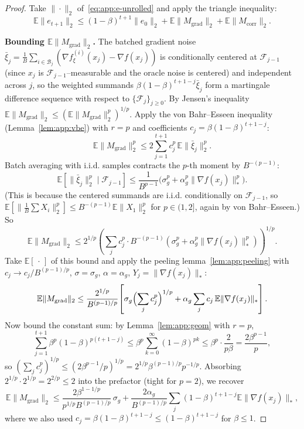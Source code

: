 \documentclass{article}
\theoremstyle{plain}
\theoremstyle{definition}
\theoremstyle{remark}
\begin{document}
\begin{proof}
Take $\|\cdot\|_2$ of~\eqref{eq:app:e-unrolled} and apply the triangle
inequality:
\[
  \mathbb{E}\|e_{t+1}\|_2 \leq (1-\beta)^{t+1}\|e_0\|_2
    + \mathbb{E}\|M_{\mathrm{grad}}\|_2 + \mathbb{E}\|M_{\mathrm{corr}}\|_2.
\]

\smallskip\noindent\textbf{Bounding $\mathbb{E}\|M_{\mathrm{grad}}\|_2$.}
The batched gradient noise $\bar\xi_j = \tfrac1B\sum_{i\in\mathcal{B}_j}
(\nabla f_\xi^{(i)}(x_j) - \nabla f(x_j))$ is conditionally centered at
$\mathcal{F}_{j-1}$ (since $x_j$ is $\mathcal{F}_{j-1}$--measurable and
the oracle noise is centered) and independent across $j$, so the weighted
summands $\beta(1-\beta)^{t+1-j}\bar\xi_j$ form a martingale difference
sequence with respect to $\{\mathcal{F}_j\}_{j \geq 0}$. By Jensen's
inequality $\mathbb{E}\|M_{\mathrm{grad}}\|_2 \leq
(\mathbb{E}\|M_{\mathrm{grad}}\|_2^p)^{1/p}$. Apply the von
Bahr--Esseen inequality (Lemma~\ref{lem:app:vbe}) with $r = p$ and
coefficients $c_j = \beta(1-\beta)^{t+1-j}$:
\[
  \mathbb{E}\|M_{\mathrm{grad}}\|_2^p
  \leq 2\sum_{j=1}^{t+1} c_j^p\, \mathbb{E}\|\bar\xi_j\|_2^p.
\]
Batch averaging with i.i.d. samples contracts the $p$-th moment by
$B^{-(p-1)}$:
\[
  \mathbb{E}[\|\bar\xi_j\|_2^p \mid \mathcal{F}_{j-1}]
  \leq \frac{1}{B^{p-1}}\bigl(\sigma_g^p + \alpha_g^p\|\nabla f(x_j)\|_*^p\bigr).
\]
(This is because the centered summands are i.i.d. conditionally on
$\mathcal{F}_{j-1}$, so $\mathbb{E}[\|\frac{1}{B}\sum X_i\|_2^p] \leq
B^{-(p-1)}\mathbb{E}\|X_1\|_2^p$ for $p \in (1, 2]$, again by von
Bahr--Esseen.) So
\[
  \mathbb{E}\|M_{\mathrm{grad}}\|_2
  \leq 2^{1/p}\!\left(\sum_j c_j^p\cdot B^{-(p-1)}
    (\sigma_g^p + \alpha_g^p\|\nabla f(x_j)\|_*^p)\right)^{\!1/p}.
\]
Take $\mathbb{E}[\,\cdot\,]$ of this bound and apply the peeling
lemma~\ref{lem:app:peeling} with $c_j \to c_j / B^{(p-1)/p}$, $\sigma =
\sigma_g$, $\alpha = \alpha_g$, $Y_j = \|\nabla f(x_j)\|_*$:
\[
  \mathbb{E}\|M_{\mathrm{grad}}\|_2
  \leq \frac{2^{1/p}}{B^{(p-1)/p}}\!\left[\sigma_g\Bigl(\sum_j c_j^p\Bigr)^{1/p}
    + \alpha_g\sum_j c_j\, \mathbb{E}\|\nabla f(x_j)\|_*\right].
\]
Now bound the constant sum: by Lemma~\ref{lem:app:geom} with $r = p$,
\[
  \sum_{j=1}^{t+1}\beta^p(1-\beta)^{p(t+1-j)}
  \leq \beta^p\sum_{k=0}^\infty (1-\beta)^{pk}
  \leq \beta^p\cdot \frac{2}{p\beta}
  = \frac{2\beta^{p-1}}{p},
\]
so $(\sum_j c_j^p)^{1/p} \leq (2\beta^{p-1}/p)^{1/p} = 2^{1/p}\beta^{(p-1)/p}
p^{-1/p}$. Absorbing $2^{1/p}\cdot 2^{1/p} = 2^{2/p} \leq 2$ into the
prefactor (tight for $p = 2$), we recover
\[
  \mathbb{E}\|M_{\mathrm{grad}}\|_2
  \leq \frac{2\beta^{1-1/p}}{p^{1/p} B^{(p-1)/p}}\, \sigma_g
    + \frac{2\alpha_g}{B^{(p-1)/p}}\sum_j (1-\beta)^{t+1-j}\mathbb{E}\|\nabla f(x_j)\|_*,
\]
where we also used $c_j = \beta(1-\beta)^{t+1-j} \leq (1-\beta)^{t+1-j}$ for $\beta \leq 1$.


\end{proof}
\end{document}
